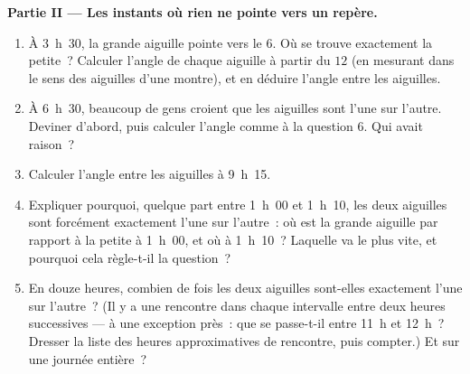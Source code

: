 \begin{problem}
\medskip
\noindent\textbf{Partie II --- Les instants où rien ne pointe vers un
repère.}
\begin{enumerate}[resume]
  \item À 3~h~30, la grande aiguille pointe vers le $6$. Où se
        trouve exactement la petite~? Calculer l'angle de chaque
        aiguille à partir du $12$ (en mesurant dans le sens des
        aiguilles d'une montre), et en déduire l'angle entre les
        aiguilles.
  \item À 6~h~30, beaucoup de gens croient que les aiguilles sont
        l'une sur l'autre. Deviner d'abord, puis calculer l'angle
        comme à la question 6. Qui avait raison~?
  \item Calculer l'angle entre les aiguilles à 9~h~15.
  \item Expliquer pourquoi, quelque part entre 1~h~00 et 1~h~10, les
        deux aiguilles sont forcément exactement l'une sur l'autre~:
        où est la grande aiguille par rapport à la petite à 1~h~00,
        et où à 1~h~10~? Laquelle va le plus vite, et pourquoi cela
        règle-t-il la question~?
  \item En douze heures, combien de fois les deux aiguilles sont-elles
        exactement l'une sur l'autre~? (Il y a une rencontre dans
        chaque intervalle entre deux heures successives --- à une
        exception près~: que se passe-t-il entre 11~h et 12~h~?
        Dresser la liste des heures approximatives de rencontre, puis
        compter.) Et sur une journée entière~?
\end{enumerate}


\end{problem}
